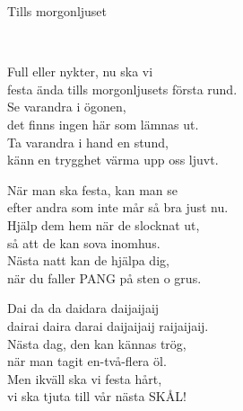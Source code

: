 \begin{song}{Tills morgonljuset}

	\\

	Full eller nykter, nu ska vi\\
	festa ända tills morgonljusets första rund.\\
	Se varandra i ögonen,\\
	det finns ingen här som lämnas ut.\\
	Ta varandra i hand en stund,\\
	känn en trygghet värma upp oss ljuvt.
	
	När man ska festa, kan man se\\
	efter andra som inte mår så bra just nu.\\
	Hjälp dem hem när de slocknat ut,\\
	så att de kan sova inomhus.\\
	Nästa natt kan de hjälpa dig,\\
	när du faller PANG på sten o grus.
	
	Dai da da daidara daijaijaij\\
	dairai daira darai daijaijaij raijaijaij.\\
	Nästa dag, den kan kännas trög,\\
	när man tagit en-två-flera öl.\\
	Men ikväll ska vi festa hårt,\\
	vi ska tjuta till vår nästa SKÅL!
	
\end{song}
